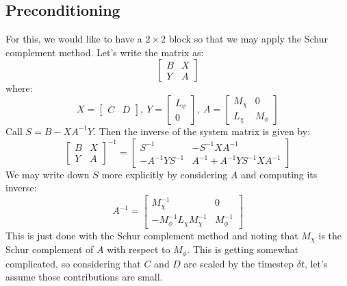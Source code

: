 \documentclass[reqno]{article}
\begin{document}
\subsection{Preconditioning}
For this, we would like to have a $2\times 2$ block so that we may apply the Schur complement method.
Let's write the matrix as:
\begin{equation}
    \begin{bmatrix}
        B &X \\
        Y &A
    \end{bmatrix}
\end{equation}
where:
\begin{equation}
    X
    =
    \begin{bmatrix}
        C &D
    \end{bmatrix}, \:
    Y 
    = 
    \begin{bmatrix}
        L_\psi \\
        0
    \end{bmatrix}, \:
    A
    =
    \begin{bmatrix}
        M_\chi &0 \\
        L_\chi &M_\phi
    \end{bmatrix}
\end{equation}
Call $S = B - X A^{-1} Y$.
Then the inverse of the system matrix is given by:
\begin{equation}
    \begin{bmatrix}
        B &X \\
        Y &A
    \end{bmatrix}^{-1}
    =
    \begin{bmatrix}
        S^{-1} &-S^{-1}X A^{-1} \\
        -A^{-1}Y S^{-1} &A^{-1} + A^{-1}YS^{-1}X A^{-1}
    \end{bmatrix}
\end{equation}
We may write down $S$ more explicitly by considering $A$ and computing its inverse:
\begin{equation}
    A^{-1}
    =
    \begin{bmatrix}
        M_\chi^{-1} &0 \\
        -M_\phi^{-1} L_\chi M_\chi^{-1} &M_\phi^{-1}
    \end{bmatrix}
\end{equation}
This is just done with the Schur complement method and noting that $M_\chi$ is the Schur complement of $A$ with respect to $M_\phi$.
This is getting somewhat complicated, so considering that $C$ and $D$ are scaled by the timestep $\delta t$, let's assume those contributions are small. 
\end{document}
